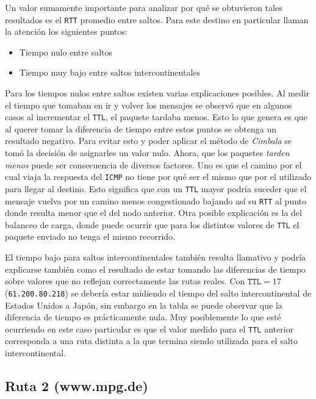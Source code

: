 Un valor sumamente importante para analizar por qué se obtuvieron tales
resultados es el \texttt{RTT} promedio entre saltos. Para este destino en
particular llaman la atención los siguientes puntos:

\begin{itemize}
    \item Tiempo nulo entre saltos
    \item Tiempo muy bajo entre saltos intercontinentales
\end{itemize}

Para los tiempos nulos entre saltos existen varias explicaciones posibles. Al
medir el tiempo que tomaban en ir y volver los mensajes se observó que en
algunos casos al incrementar el \texttt{TTL}, el paquete tardaba menos. Esto lo
que genera es que al querer tomar la diferencia de tiempo entre estos puntos se
obtenga un resultado negativo. Para evitar esto y poder aplicar el método de
\emph{Cimbala} se tomó la decisión de asignarles un valor nulo. Ahora, que los
paquetes \emph{tarden menos} puede ser consecuencia de diversos factores. Uno es
que el camino por el cual viaja la respuesta del \texttt{ICMP} no tiene por qué
ser el mismo que por el utilizado para llegar al destino.  Esto significa que con un
\texttt{TTL} mayor podría suceder que el mensaje vuelva por un camino menos
congestionado bajando así su \texttt{RTT} al punto donde resulta menor que el
del nodo anterior. Otra posible explicación es la del balanceo de carga, donde
puede ocurrir que para los distintos valores de \texttt{TTL} el paquete enviado
no tenga el mismo recorrido.

El tiempo bajo para saltos intercontinentales también resulta llamativo y podría
explicarse también como el resultado de estar tomando las diferencias de tiempo
sobre valores que no reflejan correctamente las rutas reales. Con $\texttt{TTL}
= 17$ (\texttt{61.200.80.218}) se debería estar midiendo el tiempo del salto
intercontinental de Estados Unidos a Japón, sin embargo en la tabla se puede
observar que la diferencia de tiempo es prácticamente nula. Muy posiblemente lo
que esté ocurriendo en este caso particular es que el valor medido para el
\texttt{TTL} anterior corresponda a una ruta distinta a la que termina siendo
utilizada para el salto intercontinental.


\subsection{Ruta 2 (www.mpg.de)}

